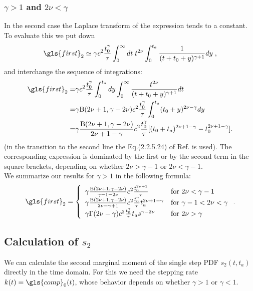 \subsubsection{$\gamma>1$ and $2\nu < \gamma$}
In the second case the Laplace transform of the expression tends to a constant. To evaluate this we put down 
\begin{equation}
 \gls{first}_2 \simeq  \gamma c^2 \frac{t_0^\gamma}{\tau} \int_0^\infty dt \; t^{2\nu} \int_0^{t_a} \frac{1}{(t+t_0+y)^{\gamma+1}} dy \; ,
\end{equation}
and interchange the sequence of integrations:
\begin{align}
 \gls{first}_2 =& \gamma c^2 \frac{ t_0^\gamma}{\tau} \int_0^{t_a} dy \int_0^\infty \frac{t^{2\nu}}{(t+t_0+y)^{\gamma+1}} dt \nonumber \\
 =& \gamma \mathrm{B}(2\nu+1,\gamma - 2\nu) c^2 \frac{ t_0^\gamma}{\tau}  \int_0^{t_a} (t_0+y)^{2\nu -\gamma} dy \nonumber \\
 =& \gamma  \frac{\mathrm{B}(2\nu+1,\gamma - 2\nu) }{2 \nu +1- \gamma } c^2 \frac{t_0^\gamma}{\tau} [(t_0+t_a)^{2\nu +1- \gamma }-t_0^{2\nu+1 - \gamma }]. \nonumber
\end{align}
%
(in the transition to the second line the Eq.(2.2.5.24) of Ref. 
\cite{BryPr} 
is used). The corresponding expression is dominated by the first or by the second term in the square 
brackets, depending on whether $2\nu > \gamma -1$ or $2\nu < \gamma -1$. \\
We summarize our results for $\gamma > 1$ in the following formula:
\begin{equation}
 \gls{first}_2 = \left\{
 \begin{array}{ll}
   \gamma \frac{\mathrm{B}(2\nu+1,\gamma - 2\nu)}{ \gamma -1 - 2 \nu} c^2 \frac{  t_0^{2\nu +1}}{\tau}  & \mbox{for } 2\nu < \gamma -1 \\
  \gamma \frac{\mathrm{B}(2\nu+1,\gamma - 2\nu)}{2 \nu - \gamma +1} c^2 \frac{ t_0^\gamma}{\tau} t_a^{2\nu +1- \gamma }  & \mbox{for } \gamma-1 < 2\nu < \gamma \\ 
 \gamma \Gamma(2\nu-\gamma) c^2 \frac{t_0^\gamma}{\tau} t_a s^{\gamma - 2\nu} & \mbox{for } 2\nu > \gamma 
 \end{array}
 \right. .
\end{equation}


\subsection*{Calculation of $s_2$}
We can calculate the second marginal moment of the single step PDF $s_{2}(t,t_a)$ directly in the time domain. For this we need the stepping rate $k(t)=\gls{comp}_0(t)$, whose behavior depends on whether $\gamma>1$ or $\gamma<1$.

